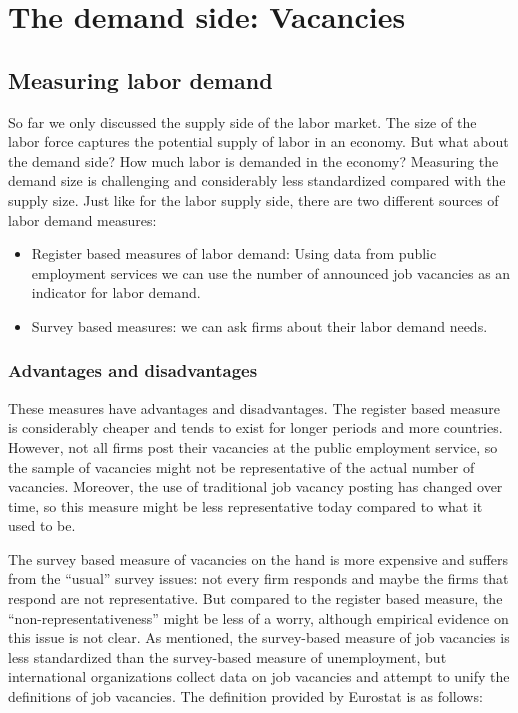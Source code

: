 \documentclass[]{book}
\providecommand{\tightlist}{%
  \setlength{\itemsep}{0pt}\setlength{\parskip}{0pt}}
\begin{document}
\hypertarget{the-demand-side-vacancies}{%
\section{The demand side: Vacancies}\label{the-demand-side-vacancies}}

\hypertarget{measuring-labor-demand}{%
\subsection{Measuring labor demand}\label{measuring-labor-demand}}

So far we only discussed the supply side of the labor market. The size of the labor force captures the potential supply of labor in an economy. But what about the demand side? How much labor is demanded in the economy? Measuring the demand size is challenging and considerably less standardized compared with the supply size. Just like for the labor supply side, there are two different sources of labor demand measures:

\begin{itemize}
\tightlist
\item
  Register based measures of labor demand: Using data from public employment services we can use the number of announced job vacancies as an indicator for labor demand.
\item
  Survey based measures: we can ask firms about their labor demand needs.
\end{itemize}

\hypertarget{advantages-and-disadvantages}{%
\subsubsection{Advantages and disadvantages}\label{advantages-and-disadvantages}}

These measures have advantages and disadvantages. The register based measure is considerably cheaper and tends to exist for longer periods and more countries. However, not all firms post their vacancies at the public employment service, so the sample of vacancies might not be representative of the actual number of vacancies. Moreover, the use of traditional job vacancy posting has changed over time, so this measure might be less representative today compared to what it used to be.

The survey based measure of vacancies on the hand is more expensive and suffers from the ``usual'' survey issues: not every firm responds and maybe the firms that respond are not representative. But compared to the register based measure, the ``non-representativeness'' might be less of a worry, although empirical evidence on this issue is not clear. As mentioned, the survey-based measure of job vacancies is less standardized than the survey-based measure of unemployment, but international organizations collect data on job vacancies and attempt to unify the definitions of job vacancies. The definition provided by Eurostat is as follows:
\end{document}
